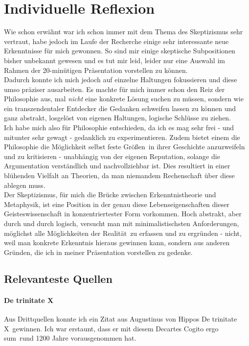 \documentclass[12pt,a4paper,final]{article}
\begin{document}
\section*{Individuelle Reflexion}
Wie schon erwähnt war ich schon immer mit dem Thema des Skeptizismus sehr vertraut, habe jedoch im Laufe der Recherche einige sehr interessante neue Erkenntnisse für mich gewonnen. So sind mir einige skeptische Subpositionen bisher unbekannt gewesen und es tut mir leid, leider nur eine Auswahl im Rahmen der 20-minütigen Präsentation vorstellen zu können.\\
Dadurch konnte ich mich jedoch auf einzelne Haltungen fokussieren und diese umso präziser ausarbeiten. Es machte für mich immer schon den Reiz der Philosophie aus, mal \emph{nicht} eine konkrete Lösung suchen zu müssen, sondern wie ein transzendentaler Entdecker die Gedanken schweifen lassen zu können und ganz abstrakt, losgelöst von eigenen Haltungen, logische Schlüsse zu ziehen.\\

Ich habe mich also für Philosophie entschieden, da ich es mag sehr frei - und mitunter sehr gewagt - gedanklich zu experimentieren. Zudem bietet einem die Philosophie die Möglichkeit selbst feste \glqq Größen\grqq\ in ihrer Geschichte anzuzweifeln und zu kritisieren - unabhängig von der eigenen Reputation, solange die Argumentation verständlich und nachvollziehbar ist. Dies resultiert in einer blühenden Vielfalt an Theorien, da man niemandem Rechenschaft über diese ablegen muss.\\
Der Skeptizismus, für mich die Brücke zwischen Erkenntnistheorie und Metaphysik, ist eine Position in der genau diese Lebenseigenschaften dieser Geisteswissenschaft in konzentriertester Form vorkommen. Hoch abstrakt, aber durch und durch logisch, versucht man mit minimalistischsten Anforderungen, möglichst alle Möglichkeiten der \glqq Realität\grqq\ zu erfassen und zu ergründen - nicht, weil man konkrete Erkenntnis hieraus gewinnen kann, sondern aus anderen Gründen, die ich in meiner Präsentation vorstellen zu gedenke.
\subsection*{Relevanteste Quellen}
\paragraph*{De trinitate X \cite{de_trini_x}} Aus Drittquellen konnte ich ein Zitat aus Augustinus von Hippos \glqq De trinitate X\grqq\  gewinnen. Ich war erstaunt, dass er mit diesem Decartes \glqq Cogito ergo sum\grqq\ rund 1200 Jahre
vorausgenommen hat. %
\end{document}
